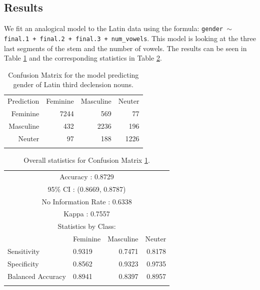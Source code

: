\subsection{Results}

We fit an analogical model to the Latin data using the formula: \texttt{gender $\sim$ final.1\- + final.2 + final.3 + num\_vowels}. This model is looking at the three last segments of the stem and the number of vowels. The results can be seen in Table \ref{tab:gender-lat} and the corresponding statistics in Table \ref{tab:gender-lat-stats}.

\begin{table}[!htpb]
  \centering
  \begin{tabular}{rrrr}
    \lsptoprule
    \multicolumn{4}{c}{Reference}                  \\
    \midrule
    Prediction     & Feminine & Masculine & Neuter \\
         Feminine  & 7244     & 569       & 77     \\
         Masculine & 432      & 2236      & 196    \\
         Neuter    & 97       & 188       & 1226   \\
    \lspbottomrule
  \end{tabular}
  \caption{Confusion Matrix for the model predicting gender of Latin third declension nouns.}\label{tab:gender-lat}
\end{table}

\begin{table}[!htpb]
  \centering
  \begin{tabular}{llrr}
    \lsptoprule
    \multicolumn{4}{c}{Overall statistics:} \\

    \midrule
    \multicolumn{4}{c}{Accuracy : 0.8729}             \\
    \multicolumn{4}{c}{95\% CI : (0.8669, 0.8787)}    \\
    \multicolumn{4}{c}{No Information Rate : 0.6338}  \\
    \multicolumn{4}{c}{Kappa : 0.7557}                \\
    \midrule
    \multicolumn{4}{c}{Statistics by Class:}          \\
    \midrule
                      & Feminine & Masculine & Neuter \\
    Sensitivity       & 0.9319   & 0.7471    & 0.8178 \\
    Specificity       & 0.8562   & 0.9323    & 0.9735 \\
    Balanced Accuracy & 0.8941   & 0.8397    & 0.8957 \\
    \lspbottomrule
  \end{tabular}
  \caption{Overall statistics for Confusion Matrix \ref{tab:gender-lat}.}\label{tab:gender-lat-stats}
\end{table}

